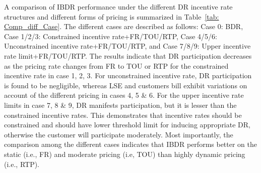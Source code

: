 \documentclass[journal]{IEEEtran}
\begin{document}
A comparison of IBDR performance under the different DR incentive rate structures and different forms of pricing is summarized in Table~\mbox{\ref{tab: Comp_diff_Case}}. The different cases are described as follows: Case 0: BDR, Case 1/2/3: Constrained incentive rate+FR/TOU/RTP, Case 4/5/6: Unconstrained incentive rate+FR/TOU/RTP, and Case 7/8/9: Upper incentive rate limit+FR/TOU/RTP. 
The results indicate that DR participation decreases as the pricing rate changes from FR to TOU or RTP for the constrained incentive rate in case 1, 2, 3. For unconstrained incentive rate, DR participation is found to be negligible, whereas LSE and customers bill exhibit variations on account of the different pricing in cases 4, 5 \& 6. For the upper incentive rate limits in case 7, 8 \& 9, DR manifests participation, but it is lesser than the constrained incentive rates. This demonstrates that incentive rates should be constrained and should have lower threshold limit for inducing appropriate DR, otherwise the customer will participate moderately. Most importantly, the comparison among the different cases indicates that IBDR performs better on the static (i.e., FR) and moderate pricing (i.e, TOU) than highly dynamic pricing (i.e., RTP).
\end{document}
